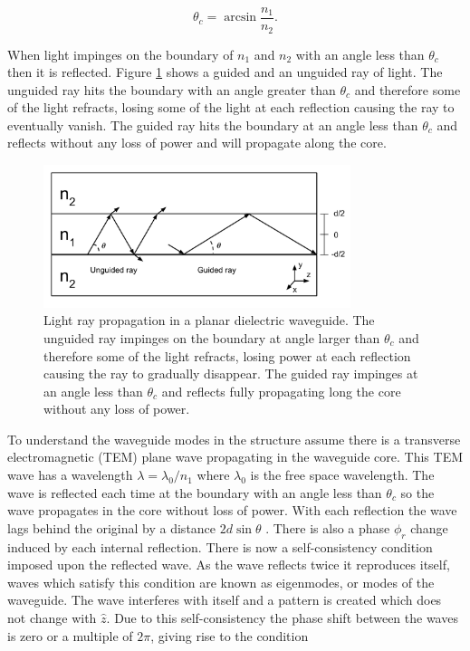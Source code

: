 \begin{equation} \theta_c = \arcsin{\frac{n_1}{n_2}}. \end{equation}

When light impinges on the boundary of $n_1$ and $n_2$ with an angle less than
$\theta_c$ then it is reflected. Figure \ref{fig:planar_reflection} shows a
guided and an unguided ray of light. The unguided ray hits the boundary with an
angle greater than $\theta_c$ and therefore some of the light refracts,
losing some of the light at each reflection causing the ray to
eventually vanish. The guided ray hits the boundary at an angle less than
$\theta_c$ and reflects without any loss of power and will propagate along the
core.

\begin{figure}[h!] \begin{center}
\includegraphics[width=0.8\textwidth]{images/thesis_planar_reflection.pdf}
\end{center} \caption{
Light ray propagation in a planar dielectric waveguide. The unguided ray
impinges on the boundary at angle larger than $\theta_c$ and therefore some of
the light refracts, losing power at each reflection causing the ray to gradually
disappear. The guided ray impinges at an angle less than $\theta_c$ and reflects
fully propagating long the core without any loss of power.
}
\label{fig:planar_reflection} \end{figure}

To understand the waveguide modes in the structure assume there is a transverse
electromagnetic (TEM) plane wave propagating in the waveguide core. This TEM
wave has a wavelength $\lambda = \lambda_0/n_1$ where $\lambda_0$ is the free
space wavelength. The wave is reflected each time at the boundary with an angle
less than $\theta_c$ so the wave propagates in the core without loss of power.
With each reflection the wave lags behind the original by a distance
$2d\sin{\theta}$ \cite{saleh1991fundamentals}. There is also a phase $\phi_r$
change induced by each internal reflection. There is now a self-consistency
condition imposed upon the reflected wave. As the wave reflects twice it
reproduces itself, waves which satisfy this condition are known as eigenmodes,
or modes of the waveguide. The wave interferes with itself and a pattern is created
which does not change with $\hat{z}$. Due to this self-consistency the phase
shift between the waves is zero or a multiple of $2\pi$, giving rise to the
condition

